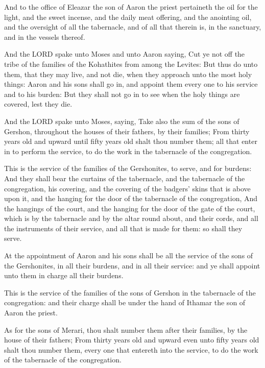 \verse And to the office of Eleazar the son of Aaron the priest
pertaineth the oil for the light, and the sweet incense, and the daily
meat offering, and the anointing oil, and the oversight of all the
tabernacle, and of all that therein is, in the sanctuary, and in the
vessels thereof.

\verse And the LORD spake unto Moses and unto Aaron saying, \verse Cut ye
not off the tribe of the families of the Kohathites from among the
Levites: \verse But thus do unto them, that they may live, and not die,
when they approach unto the most holy things: Aaron and his sons shall
go in, and appoint them every one to his service and to his burden:
\verse But they shall not go in to see when the holy things are covered,
lest they die.

\verse And the LORD spake unto Moses, saying, \verse Take also the sum of
the sons of Gershon, throughout the houses of their fathers, by their
families; \verse From thirty years old and upward until fifty years old
shalt thou number them; all that enter in to perform the service, to
do the work in the tabernacle of the congregation.

\verse This is the service of the families of the Gershonites, to serve,
and for burdens: \verse And they shall bear the curtains of the
tabernacle, and the tabernacle of the congregation, his covering, and
the covering of the badgers' skins that is above upon it, and the
hanging for the door of the tabernacle of the congregation, \verse And
the hangings of the court, and the hanging for the door of the gate of
the court, which is by the tabernacle and by the altar round about,
and their cords, and all the instruments of their service, and all
that is made for them: so shall they serve.

\verse At the appointment of Aaron and his sons shall be all the service
of the sons of the Gershonites, in all their burdens, and in all their
service: and ye shall appoint unto them in charge all their burdens.

\verse This is the service of the families of the sons of Gershon in the
tabernacle of the congregation: and their charge shall be under the
hand of Ithamar the son of Aaron the priest.

\verse As for the sons of Merari, thou shalt number them after their
families, by the house of their fathers; \verse From thirty years old
and upward even unto fifty years old shalt thou number them, every one
that entereth into the service, to do the work of the tabernacle of
the congregation.

